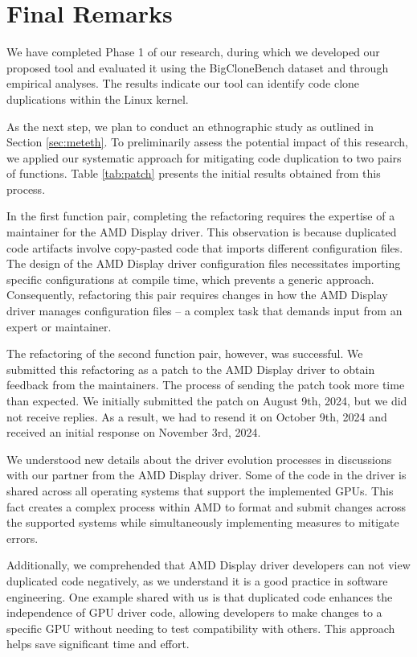 \en

\section{Final Remarks}


We have completed Phase 1 of our research, during which we developed our proposed tool and evaluated it using the BigCloneBench dataset and through empirical analyses. The results indicate our tool can identify code clone duplications within the Linux kernel.

As the next step, we plan to conduct an ethnographic study as outlined in Section \ref{sec:meteth}. To preliminarily assess the potential impact of this research, we applied our systematic approach for mitigating code duplication to two pairs of functions. Table \ref{tab:patch} presents the initial results obtained from this process.



In the first function pair, completing the refactoring requires the expertise of a maintainer for the AMD Display driver. This observation is because duplicated code artifacts involve copy-pasted code that imports different configuration files. The design of the AMD Display driver configuration files necessitates importing specific configurations at compile time, which prevents a generic approach. Consequently, refactoring this pair requires changes in how the AMD Display driver manages configuration files -- a complex task that demands input from an expert or maintainer.

The refactoring of the second function pair, however, was successful. We submitted this refactoring as a patch to the AMD Display driver to obtain feedback from the maintainers. The process of sending the patch took more time than expected. We initially submitted the patch on August 9th, 2024, but we did not receive replies. As a result, we had to resend it on October 9th, 2024 and received an initial response on November 3rd, 2024. 

We understood new details about the driver evolution processes in discussions with our partner from the AMD Display driver. Some of the code in the driver is shared across all operating systems that support the implemented GPUs. This fact creates a complex process within AMD to format and submit changes across the supported systems while simultaneously implementing measures to mitigate errors.

Additionally, we comprehended that AMD Display driver developers can not view duplicated code negatively, as we understand it is a good practice in software engineering. One example shared with us is that duplicated code enhances the independence of GPU driver code, allowing developers to make changes to a specific GPU without needing to test compatibility with others. This approach helps save significant time and effort. 

